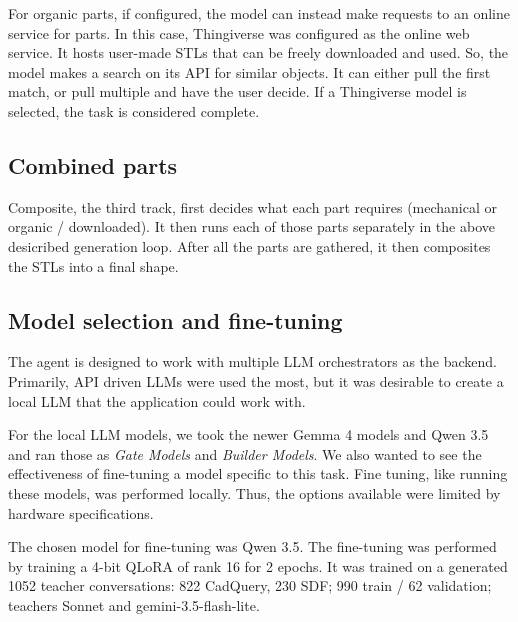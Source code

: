 For organic parts, if configured, the model can instead make requests to an online service for parts.
In this case, Thingiverse was configured as the online web service. It hosts user-made STLs that can be freely downloaded and used.
So, the model makes a search on its API for similar objects.
It can either pull the first match, or pull multiple and have the user decide.
If a Thingiverse model is selected, the task is considered complete.

\subsection{Combined parts}

Composite, the third track, first decides what each part requires (mechanical or organic / downloaded).
It then runs each of those parts separately in the above desicribed generation loop.
After all the parts are gathered, it then composites the STLs into a final shape.


\subsection{Model selection and fine-tuning}
\label{sec:finetune}

The agent is designed to work with multiple LLM orchestrators as the backend.
Primarily, API driven LLMs were used the most, but it was desirable to create a local LLM that the application could work with.

For the local LLM models, we took the newer Gemma 4 models and Qwen 3.5 and ran those as \textit{Gate Models} and \textit{Builder Models}.
We also wanted to see the effectiveness of fine-tuning a model specific to this task.
Fine tuning, like running these models, was performed locally. Thus, the options available were limited by hardware specifications.

The chosen model for fine-tuning was Qwen 3.5. The fine-tuning was performed by training a 4-bit QLoRA of rank 16 for 2 epochs.
It was trained on a generated 1052 teacher conversations: 822 CadQuery, 230 SDF; 990 train / 62 validation; teachers Sonnet and gemini-3.5-flash-lite.